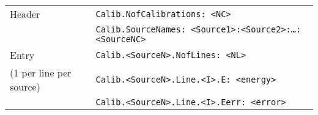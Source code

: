 \documentclass[10pt]{article}
\begin{document}
\begin{center}
\begin{tabular}{|l|l|}
\hline
Header	&	\texttt{Calib.NofCalibrations: <NC>}		\\
	&	\texttt{Calib.SourceNames: <Source1>:<Source2>:\dots:<SourceNC>}		\\
\hline
Entry	&	\texttt{Calib.<SourceN>.NofLines: <NL>}		\\
(1 per line per source) &	\texttt{Calib.<SourceN>.Line.<I>.E: <energy>}		\\
	&	\texttt{Calib.<SourceN>.Line.<I>.Eerr: <error>}		\\
\hline
\end{tabular}
\end{center}
\end{document}
